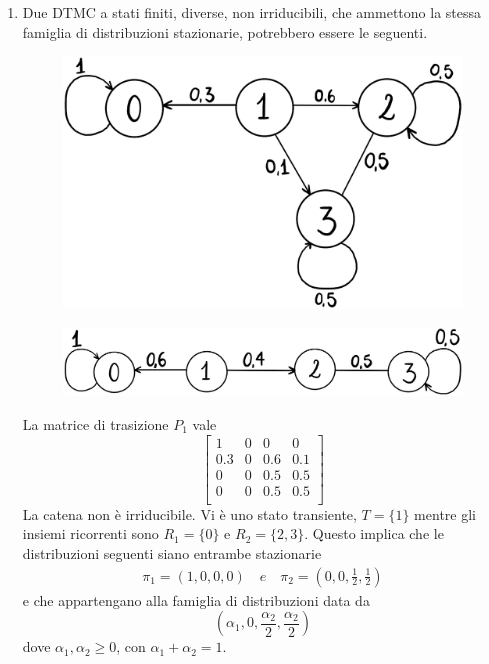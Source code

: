 \documentclass[12pt]{homework}
\begin{document}
\begin{enumerate}
  \newpage
  \item
  
  Due DTMC a stati finiti, diverse, non irriducibili, che ammettono la stessa famiglia di distribuzioni stazionarie, potrebbero essere le seguenti. 
 \begin{figure}[htb]\centering
\includegraphics[scale=0.09]{Catena3.1.eps}
  \end{figure}
  \begin{figure}[h]\centering
\includegraphics[scale=0.11]{Catena3.2.eps}
  \end{figure}
     
  La matrice di trasizione $P_1$ vale 
  \[\begin{bmatrix}
        1 & 0 & 0 & 0\\
        0.3 & 0 & 0.6 & 0.1\\ 
        0 & 0 & 0.5 & 0.5\\
        0 & 0 & 0.5 & 0.5\\
      \end{bmatrix}\]
La catena non è irriducibile. Vi è uno stato transiente, $T = \{1\}$ mentre gli insiemi ricorrenti sono $R_1 = \{0\}$ e $R_2 = \{2,3\}$. Questo implica che le distribuzioni seguenti siano entrambe stazionarie 
\begin{align*}
\pi_1 = (1, 0, 0, 0)\,\,\,\,\,\,e\,\,\,\,\,\, \pi_2= (0, 0, \frac{1}{2}, \frac{1}{2}) 
\end{align*}
e che appartengano alla famiglia di distribuzioni data da 
\[(\alpha_1, 0, \frac{\alpha_2}{2}, \frac{\alpha_2}{2})\]
dove $\alpha_1, \alpha_2 \geq 0$, con $\alpha_1+\alpha_2 = 1$.



\end{enumerate}
\end{document}
